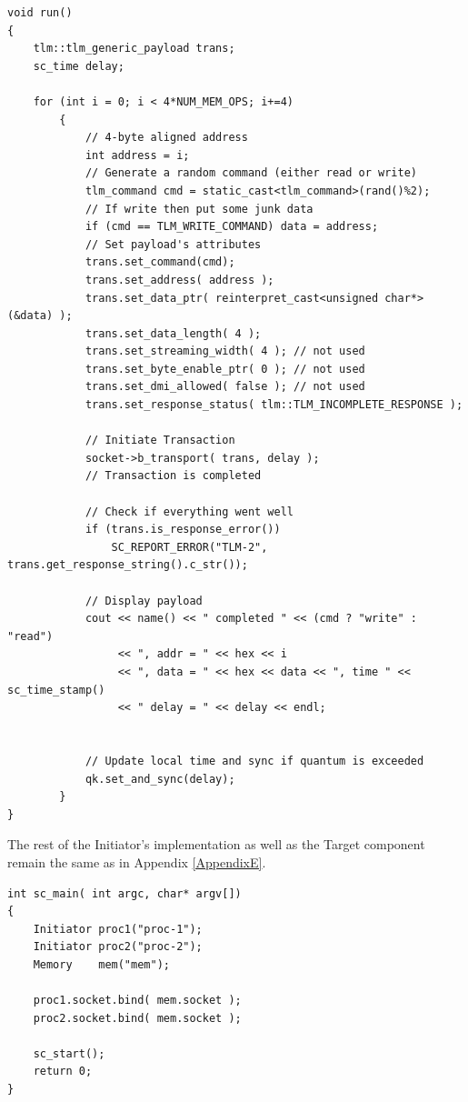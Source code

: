 \documentclass[11pt]{article}
\begin{document}
\begin{verbatim}
void run()
{
    tlm::tlm_generic_payload trans;
    sc_time delay;

    for (int i = 0; i < 4*NUM_MEM_OPS; i+=4)
        {
            // 4-byte aligned address
            int address = i;
            // Generate a random command (either read or write)
            tlm_command cmd = static_cast<tlm_command>(rand()%2);
            // If write then put some junk data
            if (cmd == TLM_WRITE_COMMAND) data = address;
            // Set payload's attributes
            trans.set_command(cmd);
            trans.set_address( address );
            trans.set_data_ptr( reinterpret_cast<unsigned char*>(&data) );
            trans.set_data_length( 4 );
            trans.set_streaming_width( 4 ); // not used
            trans.set_byte_enable_ptr( 0 ); // not used
            trans.set_dmi_allowed( false ); // not used
            trans.set_response_status( tlm::TLM_INCOMPLETE_RESPONSE );

            // Initiate Transaction
            socket->b_transport( trans, delay );
            // Transaction is completed

            // Check if everything went well
            if (trans.is_response_error())
                SC_REPORT_ERROR("TLM-2", trans.get_response_string().c_str());

            // Display payload
            cout << name() << " completed " << (cmd ? "write" : "read") 
                 << ", addr = " << hex << i
                 << ", data = " << hex << data << ", time " << sc_time_stamp()
                 << " delay = " << delay << endl;


            // Update local time and sync if quantum is exceeded
            qk.set_and_sync(delay);
        }
}
\end{verbatim}

The rest of the Initiator's implementation as well as the Target component remain the same as in Appendix \ref{AppendixE}.
\begin{verbatim}
int sc_main( int argc, char* argv[])
{
    Initiator proc1("proc-1");
    Initiator proc2("proc-2");
    Memory    mem("mem");

    proc1.socket.bind( mem.socket );
    proc2.socket.bind( mem.socket );

    sc_start();
    return 0;
}
\end{verbatim}
\clearpage
\end{document}
